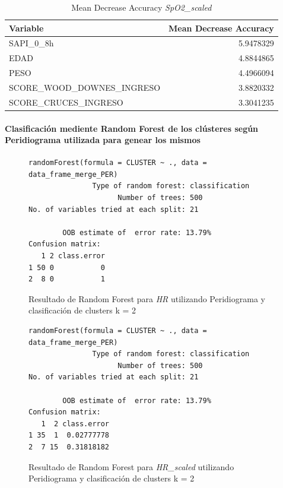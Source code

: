 \begin{table}[H]
    \centering
    \begin{tabular}{lr}
        \toprule
        \textbf{Variable} & \textbf{Mean Decrease Accuracy} \\
        \midrule
        SAPI\_0\_8h & 5.9478329 \\
        EDAD & 4.8844865 \\
        PESO & 4.4966094 \\
        SCORE\_WOOD\_DOWNES\_INGRESO & 3.8820332 \\
        SCORE\_CRUCES\_INGRESO & 3.3041235 \\
        \bottomrule
    \end{tabular}
    \caption{Mean Decrease Accuracy \textit{SpO2\_scaled}}
\end{table}


\paragraph{Clasificación mediente Random Forest de los clústeres según Peridiograma utilizada para genear los mismos} 

\begin{figure}[H]
    \centering
    \begin{lstlisting}[frame=single, basicstyle=\small\ttfamily]
        randomForest(formula = CLUSTER ~ ., data = data_frame_merge_PER) 
               Type of random forest: classification
                     Number of trees: 500
No. of variables tried at each split: 21

        OOB estimate of  error rate: 13.79%
Confusion matrix:
   1 2 class.error
1 50 0           0
2  8 0           1
    \end{lstlisting}
    \caption{Resultado de Random Forest para \textit{HR} utilizando Peridiograma y clasificación de clusters k = 2}\label{fig:random_forest_per_result_RF_1}
\end{figure}
\begin{figure}[H]
    \centering
    \begin{lstlisting}[frame=single, basicstyle=\small\ttfamily]
        randomForest(formula = CLUSTER ~ ., data = data_frame_merge_PER) 
               Type of random forest: classification
                     Number of trees: 500
No. of variables tried at each split: 21

        OOB estimate of  error rate: 13.79%
Confusion matrix:
   1  2 class.error
1 35  1  0.02777778
2  7 15  0.31818182
    \end{lstlisting}
    \caption{Resultado de Random Forest para \textit{HR\_scaled} utilizando Peridiograma y clasificación de clusters k = 2}
    \label{fig:random_forest_per_result_RF_2}
\end{figure}

